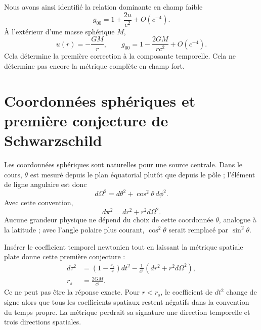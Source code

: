 Nous avons ainsi identifié la relation dominante en champ faible
\begin{equation}
g_{00}=1+\frac{2u}{c^2}+O(c^{-4}).
\label{eq:l5-g00-newton}
\end{equation}
À l’extérieur d’une masse sphérique \(M\),
\begin{equation}
u(r)=-\frac{GM}{r},
\qquad
g_{00}=1-\frac{2GM}{rc^2}+O(c^{-4}).
\label{eq:l5-g00-spherical}
\end{equation}
Cela détermine la première correction à la composante temporelle. Cela ne détermine pas encore la métrique complète en champ fort.

\section{Coordonnées sphériques et première conjecture de Schwarzschild}

Les coordonnées sphériques sont naturelles pour une source centrale. Dans le cours, \(\theta\) est mesuré depuis le plan équatorial plutôt que depuis le pôle ; l’élément de ligne angulaire est donc
\begin{equation}
d\Omega^2=d\theta^2+\cos^2\theta\,d\phi^2.
\label{eq:l5-angular-metric}
\end{equation}
Avec cette convention,
\begin{equation}
d\mathbf{x}^2=dr^2+r^2d\Omega^2.
\label{eq:l5-flat-spherical}
\end{equation}
Aucune grandeur physique ne dépend du choix de cette coordonnée \(\theta\), analogue à la latitude ; avec l’angle polaire plus courant, \(\cos^2\theta\) serait remplacé par \(\sin^2\theta\).

Insérer le coefficient temporel newtonien tout en laissant la métrique spatiale plate donne cette première conjecture :
\begin{equation}
\begin{aligned}
d\tau^2
&=\left(1-\frac{r_s}{r}\right)dt^2
-\frac{1}{c^2}\left(dr^2+r^2d\Omega^2\right),\\
r_s&=\frac{2GM}{c^2}.
\end{aligned}
\label{eq:l5-naive-schwarzschild}
\end{equation}
Ce ne peut pas être la réponse exacte. Pour \(r<r_s\), le coefficient de \(dt^2\) change de signe alors que tous les coefficients spatiaux restent négatifs dans la convention du temps propre. La métrique perdrait sa signature une direction temporelle et trois directions spatiales.


